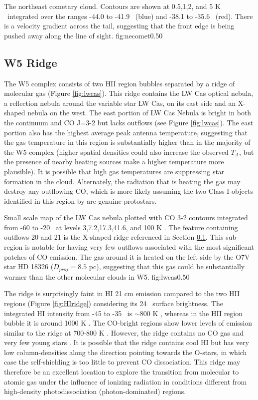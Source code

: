 {The northeast cometary cloud.  Contours are shown at 0.5,1,2, and 5 K \kms\
integrated over the ranges -44.0 to -41.9 \kms\ (blue) and -38.1 to -35.6 \kms\
(red).  There is a velocity gradient across the tail, suggesting that the front
edge is being pushed away along the line of sight.}
{fig:necomet}{0.5}{0}

\subsection{W5 Ridge}
\label{sec:w5ridge}
The W5 complex consists of two HII region bubbles separated by a ridge of
molecular gas (Figure \ref{fig:lwcas}).  This ridge contains the LW Cas optical
nebula, a reflection nebula around the variable star LW Cas, on its east side
and an X-shaped nebula on the west.  The east portion of LW Cas Nebula is
bright in both the continuum and CO J=3-2 but lacks outflows (see Figure
\ref{fig:lwcas}).  The east portion also has the highest average peak antenna
temperature, suggesting that the gas temperature in this region is
substantially higher than in the majority of the W5 complex (higher spatial
densities could also increase the observed $T_A$, but the presence of nearby heating
sources make a higher temperature more plausible).  It is possible
that high gas temperatures are suppressing star formation in the cloud.
Alternately, the radiation that is heating the gas may destroy any outflowing
CO, which is more likely assuming the two Class I objects identified in this
region by \citet{koenig:clustered:2008} are genuine protostars.

\Figure{figures_chw5/LWCas_CO32on24UM} %
{Small scale map of the LW Cas nebula plotted with CO 3-2 contours integrated
from -60 to -20 \kms\ at levels 3,7.2,17.3,41.6, and 100 K \kms.  The feature containing outflows 20 and
21 is the X-shaped ridge referenced in Section \ref{sec:w5ridge}.  This
sub-region is notable for having very few outflows associated with the most
significant patches of CO emission.   The gas
around it is heated on the left side by the O7V star HD 18326 ($D_{proj}=8.5$
pc), suggesting that this gas could be substantially warmer than the other
molecular clouds in W5.
}{fig:lwcas}{0.5}{0}

The ridge is surprisingly faint in HI 21 cm emission compared to the two HII regions
(Figure \ref{fig:HIridge}) considering its 24 \um\ surface brightness.  The
integrated HI intensity from -45 to -35 \kms\ is $\sim800$ K \kms, whereas in
the HII region bubble it is around 1000 K \kms.  The CO-bright regions show
lower levels of emission similar to the ridge at 700-800 K \kms.  However, the
ridge contains no CO gas and very few young stars \citep[Figure 7 in
][]{koenig:clustered:2008}.  It is possible that the ridge contains cool HI but
has very low column-densities along the direction pointing towards the O-stars,
in which case the self-shielding is too little to prevent CO dissociation.
This ridge may therefore be an excellent location to explore the transition
from molecular to atomic gas under the influence of ionizing radiation in
conditions different from high-density photodissociation (photon-dominated)
regions.

